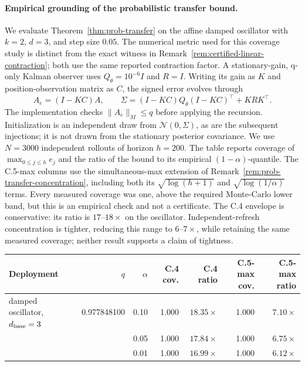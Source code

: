 \paragraph{Empirical grounding of the probabilistic transfer bound.}
We evaluate Theorem~\ref{thm:prob-transfer} on the affine damped oscillator with
$k=2$, $d=3$, and step size $0.05$. The numerical metric used for this coverage
study is distinct from the exact witness in
Remark~\ref{rem:certified-linear-contraction}; both use the same reported
contraction factor. A stationary-gain, q-only Kalman
observer uses $Q_\theta=10^{-6}I$ and $R=I$. Writing its gain as $K$ and
position-observation matrix as $C$, the signed error evolves through
\[
 A_e=(I-KC)A,\qquad
 \Sigma=(I-KC)Q_\theta(I-KC)^\top+KRK^\top.
\]
The implementation checks $\|A_e\|_M\le q$ before applying the recursion.
Initialization is an independent draw from $\mathcal N(0,\Sigma)$, as are
the subsequent injections; it is not drawn from the stationary posterior
covariance. We use $N=3000$ independent rollouts of horizon $h=200$.
The table reports coverage of
$\max_{0\leq j\leq h}e_j$ and the ratio of the bound to its empirical
$(1-\alpha)$-quantile.  The C.5-max columns use the simultaneous-max extension
of Remark~\ref{rem:prob-transfer-concentration}, including both its
$\sqrt{\log(h+1)}$ and $\sqrt{\log(1/\alpha)}$ terms. Every measured coverage was one,
above the required Monte-Carlo lower band, but this is an empirical check and
not a certificate.  The C.4 envelope is conservative: its ratio is
$17$--$18\times$ on the oscillator.  Independent-refresh concentration is tighter,
reducing this range to $6$--$7\times$, while retaining
the same measured coverage; neither result supports a claim of tightness.

\begin{center}
\setlength{\tabcolsep}{4pt}
\begin{tabular}{@{}lrrrrrr@{}}
\toprule
Deployment & $q$ & $\alpha$ & C.4 cov. & C.4 ratio & C.5-max cov. & C.5-max ratio \\
\midrule
damped oscillator, $d_{\rm base}=3$
  & 0.977848100 & 0.10 & 1.000 & $18.35\times$ & 1.000 & $7.10\times$ \\
  &             & 0.05 & 1.000 & $17.84\times$ & 1.000 & $6.75\times$ \\
  &             & 0.01 & 1.000 & $16.99\times$ & 1.000 & $6.12\times$ \\
\bottomrule
\end{tabular}
\end{center}
